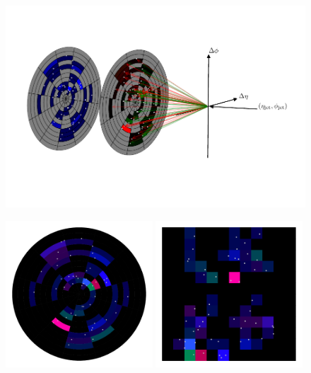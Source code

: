 \begin{figure}[h!]
    \includegraphics[width=\textwidth]{figures/event_selection/jet_diagram_RGB.pdf}
    \begin{center}
        \includegraphics[width=0.49\textwidth]{figures/event_selection/full_image_polar.pdf}
        \includegraphics[width=0.49\textwidth]{figures/event_selection/full_image_rect.pdf}
    \end{center}


\end{figure}

